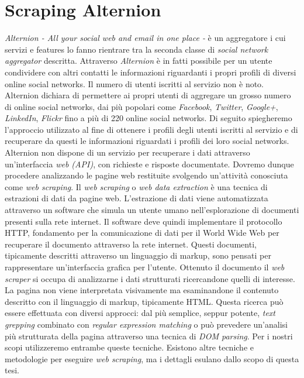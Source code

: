 \section{Scraping Alternion}
\textit{Alternion - All your social web and email in one place -} è un aggregatore i cui servizi e features lo fanno rientrare tra la seconda classe di \textit{social network aggregator} descritta. Attraverso \textit{Alternion} è in fatti possibile per un utente condividere con altri contatti le informazioni riguardanti i propri profili di diversi online social networks. Il numero di utenti iscritti al servizio non è noto. Alternion dichiara di permettere ai propri utenti di aggregare un grosso numero di online social networks, dai più popolari come \textit{Facebook}, \textit{Twitter}, \textit{Google+}, \textit{LinkedIn}, \textit{Flickr} fino a più di 220 online social networks.
Di seguito spiegheremo l'approccio utilizzato al fine di ottenere i profili degli utenti iscritti al servizio e di recuperare da questi le informazioni riguardati i profili dei loro social networks. Alternion non dispone di un servizio per recuperare i dati attraverso un'interfaccia \textit{web (API)}, con richieste e risposte documentate. Dovremo dunque procedere analizzando le pagine web restituite svolgendo un'attività conosciuta come \textit{web scraping}.
Il \textit{web scraping} o \textit{web data extraction} è una tecnica di estrazioni di dati da pagine web. L'estrazione di dati viene automatizzata attraverso un software che simula un utente umano nell'esplorazione di documenti presenti sulla rete internet. Il software deve quindi implementare il protocollo HTTP, fondamento per la comunicazione di dati per il World Wide Web per recuperare il documento attraverso la rete internet. Questi documenti, tipicamente descritti attraverso un linguaggio di markup, sono pensati per rappresentare un'interfaccia grafica per l'utente. Ottenuto il documento il \textit{web scraper} si occupa di analizzarne i dati strutturati ricercandone quelli di interesse. La pagina non viene interpretata visivamente ma esaminandone il contenuto descritto con il linguaggio di markup, tipicamente HTML. Questa ricerca può essere effettuata con diversi approcci: dal più semplice, seppur potente, \textit{text grepping} combinato con \textit{regular expression matching} o può prevedere un'analisi più strutturata della pagina attraverso una tecnica di \textit{DOM parsing}. Per i nostri scopi utilizzeremo entrambe queste tecniche. Esistono altre tecniche e metodologie per eseguire \textit{web scraping}, ma i dettagli esulano dallo scopo di questa tesi.
